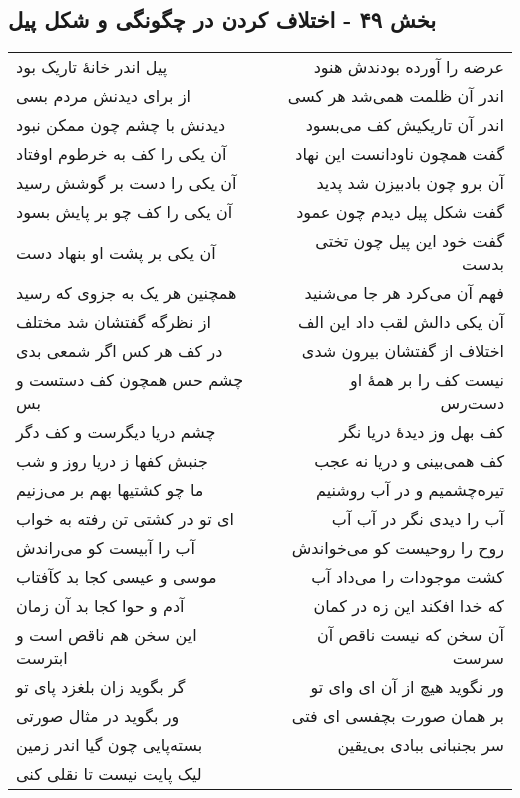 \begin{center}
\section*{بخش ۴۹ - اختلاف کردن در چگونگی و شکل پیل}
\label{sec:sh049}
\begin{longtable}{l p{0.5cm} r}
پیل اندر خانهٔ تاریک بود
&&
عرضه را آورده بودندش هنود
\\
از برای دیدنش مردم بسی
&&
اندر آن ظلمت همی‌شد هر کسی
\\
دیدنش با چشم چون ممکن نبود
&&
اندر آن تاریکیش کف می‌بسود
\\
آن یکی را کف به خرطوم اوفتاد
&&
گفت همچون ناودانست این نهاد
\\
آن یکی را دست بر گوشش رسید
&&
آن برو چون بادبیزن شد پدید
\\
آن یکی را کف چو بر پایش بسود
&&
گفت شکل پیل دیدم چون عمود
\\
آن یکی بر پشت او بنهاد دست
&&
گفت خود این پیل چون تختی بدست
\\
همچنین هر یک به جزوی که رسید
&&
فهم آن می‌کرد هر جا می‌شنید
\\
از نظرگه گفتشان شد مختلف
&&
آن یکی دالش لقب داد این الف
\\
در کف هر کس اگر شمعی بدی
&&
اختلاف از گفتشان بیرون شدی
\\
چشم حس همچون کف دستست و بس
&&
نیست کف را بر همهٔ او دست‌رس
\\
چشم دریا دیگرست و کف دگر
&&
کف بهل وز دیدهٔ دریا نگر
\\
جنبش کفها ز دریا روز و شب
&&
کف همی‌بینی و دریا نه عجب
\\
ما چو کشتیها بهم بر می‌زنیم
&&
تیره‌چشمیم و در آب روشنیم
\\
ای تو در کشتی تن رفته به خواب
&&
آب را دیدی نگر در آب آب
\\
آب را آبیست کو می‌راندش
&&
روح را روحیست کو می‌خواندش
\\
موسی و عیسی کجا بد کآفتاب
&&
کشت موجودات را می‌داد آب
\\
آدم و حوا کجا بد آن زمان
&&
که خدا افکند این زه در کمان
\\
این سخن هم ناقص است و ابترست
&&
آن سخن که نیست ناقص آن سرست
\\
گر بگوید زان بلغزد پای تو
&&
ور نگوید هیچ از آن ای وای تو
\\
ور بگوید در مثال صورتی
&&
بر همان صورت بچفسی ای فتی
\\
بسته‌پایی چون گیا اندر زمین
&&
سر بجنبانی ببادی بی‌یقین
\\
لیک پایت نیست تا نقلی کنی

\end{longtable}
\end{center}
